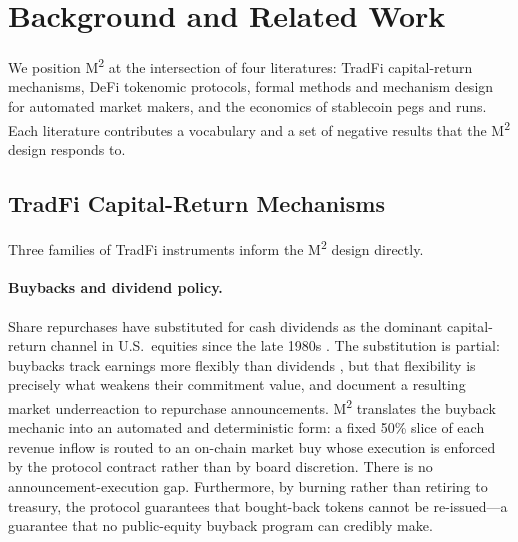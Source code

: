 \section{Background and Related Work}
\label{sec:related-work}

We position M\textsuperscript{2} at the intersection of four literatures: TradFi capital-return mechanisms, DeFi tokenomic protocols, formal methods and mechanism design for automated market makers, and the economics of stablecoin pegs and runs. Each literature contributes a vocabulary and a set of negative results that the M\textsuperscript{2} design responds to.

\subsection{TradFi Capital-Return Mechanisms}
\label{sec:related-tradfi}

Three families of TradFi instruments inform the M\textsuperscript{2} design directly.

\paragraph{Buybacks and dividend policy.} Share repurchases have substituted for cash dividends as the dominant capital-return channel in U.S.\ equities since the late 1980s \citep{GrullonMichaely2002}. The substitution is partial: buybacks track earnings more flexibly than dividends \citep{Skinner2008}, but that flexibility is precisely what weakens their commitment value, and \citet{IkenberryLakonishokVermaelen1995} document a resulting market underreaction to repurchase announcements. M\textsuperscript{2} translates the buyback mechanic into an automated and deterministic form: a fixed 50\% slice of each revenue inflow is routed to an on-chain market buy whose execution is enforced by the protocol contract rather than by board discretion. There is no announcement-execution gap. Furthermore, by burning rather than retiring to treasury, the protocol guarantees that bought-back tokens cannot be re-issued---a guarantee that no public-equity buyback program can credibly make.

